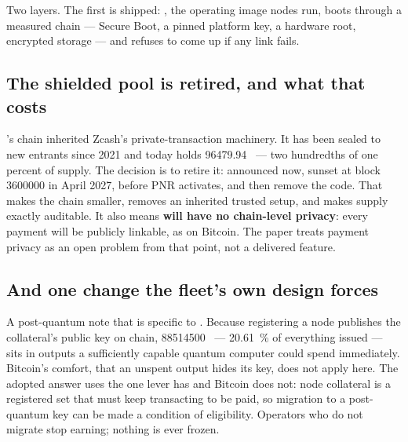 Two layers. The first is shipped: \ArcaneOS{}, the operating image nodes run, boots through a
measured chain --- Secure Boot, a pinned platform key, a hardware root, encrypted storage --- and
refuses to come up if any link fails. 

\subsection{The shielded pool is retired, and what that costs}

\Flux{}'s chain inherited Zcash's private-transaction machinery. It has been sealed to new entrants
since 2021 and today holds \num{96479.94}~\flux{} --- two hundredths of one percent of supply. The
decision is to retire it: announced now, sunset at block \num{3600000} in April 2027, before PNR
activates, and then remove the code. That makes the chain smaller, removes an inherited trusted
setup, and makes supply exactly auditable. It also means \textbf{\Flux{} will have no chain-level
privacy}: every payment will be publicly linkable, as on Bitcoin. The paper treats payment privacy
as an open problem from that point, not a delivered feature.

\subsection{And one change the fleet's own design forces}

A post-quantum note that is specific to \Flux{}. Because registering a node publishes the
collateral's public key on chain, \num{88514500}~\flux{} --- \SI{20.61}{\percent} of everything
issued --- sits in outputs a sufficiently capable quantum computer could spend immediately. Bitcoin's
comfort, that an unspent output hides its key, does not apply here. The adopted answer uses the one
lever \Flux{} has and Bitcoin does not: node collateral is a registered set that must keep
transacting to be paid, so migration to a post-quantum key can be made a condition of eligibility.
Operators who do not migrate stop earning; nothing is ever frozen.
